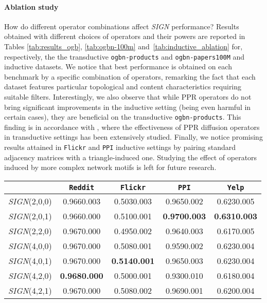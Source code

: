 \documentclass{article}
\begin{document}
\paragraph{Ablation study}
How do different operator combinations affect \textit{SIGN} performance? Results obtained with different choices of operators and their powers are reported in Tables \ref{tab:results_ogb}, \ref{tab:ogbn-100m} and~\ref{tab:inductive_ablation} for, respectively, the the transductive \texttt{ogbn-products} and \texttt{ogbn-papers100M} and inductive datasets. We notice that best performance is obtained on each benchmark by a specific combination of operators, remarking the fact that each dataset features particular topological and content characteristics requiring suitable filters. Interestingly, we also observe that while PPR operators do not bring significant improvements in the inductive setting (being even harmful in certain cases), they are beneficial on the transductive \texttt{ogbn-products}. This finding is in accordance with \cite{klicpera_diffusion_2019}, where the effectiveness of PPR diffusion operators in transductive settings has been extensively studied. Finally, we notice promising results attained in \texttt{Flickr} and \texttt{PPI} inductive settings by pairing standard adjacency matrices with a triangle-induced one.
Studying the effect of operators induced by more complex network motifs is left for future research.

\begin{table*}[t]
    \centering
    \caption{Impact of various operator combinations on inductive datasets. Best results are in bold.}
    \label{tab:inductive_ablation}
    \begin{tabular}{| c | cccc |}
        \hline
        & \texttt{Reddit} & \texttt{Flickr} & \texttt{PPI} & \texttt{Yelp} \\
        \hline
        \textit{SIGN}(2,0,0) & 0.9660.003 & 0.5030.003 & 0.9650.002 & 0.6230.005 \\
        \textit{SIGN}(2,0,1) & 0.9660.000 & 0.5100.001 & \textbf{0.9700.003} & \textbf{0.6310.003} \\\textit{SIGN}(2,2,0) & 0.9670.000 & 0.4950.002 & 0.9640.003 & 0.6170.005 \\
        \textit{SIGN}(4,0,0) & 0.9670.000 & 0.5080.001 & 0.9590.002 & 0.6230.004 \\
        \textit{SIGN}(4,0,1) & 0.9670.000 & \textbf{0.5140.001} & 0.9650.003 & 0.6230.004 \\\textit{SIGN}(4,2,0) & \textbf{0.9680.000} & 0.5000.001 & 0.9300.010 & 0.6180.004 \\
        \textit{SIGN}(4,2,1) & 0.9670.000 & 0.5080.002 & 0.9690.001 & 0.6200.004 \\\hline
    \end{tabular} 
\end{table*}
\end{document}

